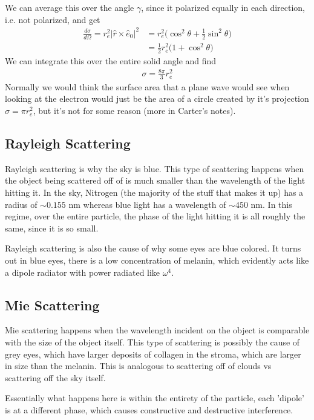 We can average this over the angle $\gamma$, since it polarized equally in each direction, i.e. not polarized, and get
\begin{align}
    \frac{d\sigma}{d\Omega} = r_e^2|\hat{r}\times\hat{e}_0|^2 &= r_e^2\Big(\cos^2\theta + \frac{1}{2}\sin^2\theta\Big)\\
    &=\frac{1}{2}r_e^2\Big(1 + \cos^2\theta\Big)
\end{align}
We can integrate this over the entire solid angle and find
\begin{align}
    \sigma = \frac{8\pi}{3}r_e^2
\end{align}
Normally we would think the surface area that a plane wave would see when looking at the electron would just be the area of a circle created by it's projection $\sigma = \pi r_e^2$, but it's not for some reason (more in Carter's notes).

\subsection{Rayleigh Scattering}
Rayleigh scattering is why the sky is blue. This type of scattering happens when the object being scattered off of is much smaller than the wavelength of the light hitting it. In the sky, Nitrogen (the majority of the stuff that makes it up) has a radius of $\sim 0.155 $ nm whereas blue light has a wavelength of $\sim 450$ nm. In this regime, over the entire particle, the phase of the light hitting it is all roughly the same, since it is so small.


Rayleigh scattering is also the cause of why some eyes are blue colored. It turns out in blue eyes, there is a low concentration of melanin, which evidently acts like a dipole radiator with power radiated like $\omega^4$.\cite{wiki_eye}
\subsection{Mie Scattering}
Mie scattering happens when the wavelength incident on the object is comparable with the size of the object itself. This type of scattering is possibly the cause of grey eyes, which have larger deposits of collagen in the stroma, which are larger in size than the melanin. This is analogous to scattering off of clouds vs scattering off the sky itself.

Essentially what happens here is within the entirety of the particle, each 'dipole' is at a different phase, which causes constructive and destructive interference.

